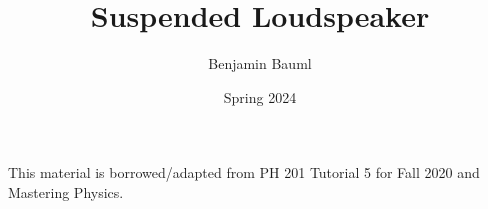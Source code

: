 \documentclass[]{article}
\title{Suspended Loudspeaker}
\author{Benjamin Bauml}
\date{Spring 2024}
\newcommand{\FileDepth}{../..}
\begin{document}
\maketitle
\begin{center}
	This material is borrowed/adapted from PH 201 Tutorial 5 for Fall 2020 and Mastering Physics.
\end{center}


\end{document}
